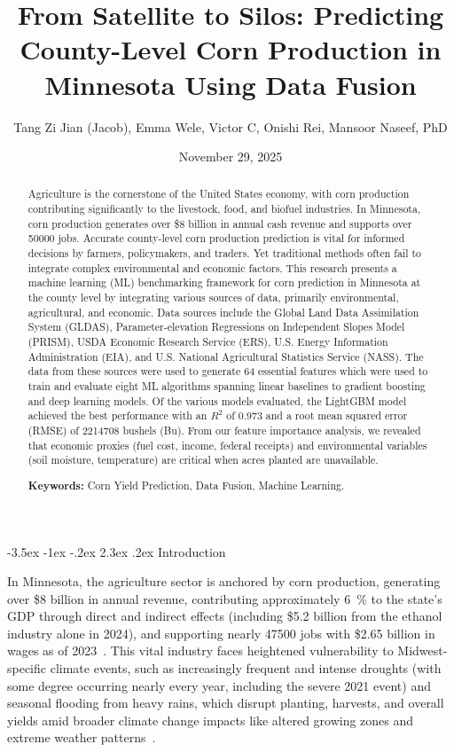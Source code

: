 \documentclass[10pt,twocolumn]{article}
\title{\large\textbf{From Satellite to Silos: Predicting County-Level Corn Production in Minnesota Using Data Fusion}}
\author{\small Tang Zi Jian (Jacob), Emma Wele, Victor C, Onishi Rei, Mansoor Naseef, PhD}
\date{\small November 29, 2025}
\makeatletter
\renewcommand\section{\@startsection{section}{1}{\z@}%
  {-3.5ex \@plus -1ex \@minus -.2ex}%
  {2.3ex \@plus.2ex}%
  {\normalfont\large\bfseries}}
\makeatother
\begin{document}
\maketitle

\begin{abstract}
\small
Agriculture is the cornerstone of the United States economy, with corn production contributing significantly to the livestock, food, and biofuel industries.
In Minnesota, corn production generates over \$8 billion in annual cash revenue and supports over \num{50000} jobs.
Accurate county-level corn production prediction is vital for informed decisions by farmers, policymakers, and traders.
Yet traditional methods often fail to integrate complex environmental and economic factors.
This research presents a machine learning (ML) benchmarking framework for corn prediction in Minnesota at the county level by integrating various sources of data, primarily environmental, agricultural, and economic.
Data sources include the Global Land Data Assimilation System (GLDAS), Parameter-elevation Regressions on Independent Slopes Model (PRISM), USDA Economic Research Service (ERS), U.S. Energy Information Administration (EIA), and U.S. National Agricultural Statistics Service (NASS).
The data from these sources were used to generate 64 essential features which were used to train and evaluate eight ML algorithms spanning linear baselines to gradient boosting and deep learning models.
Of the various models evaluated, the LightGBM model achieved the best performance with an \(R^2\) of \num{0.973} and a root mean squared error (RMSE) of \num{2214708} bushels (Bu).
From our feature importance analysis, we revealed that economic proxies (fuel cost, income, federal receipts) and environmental variables (soil moisture, temperature) are critical when acres planted are unavailable.

\textbf{Keywords:} Corn Yield Prediction, Data Fusion, Machine Learning.
\end{abstract}

\section{Introduction}

In Minnesota, the agriculture sector is anchored by corn production, generating over \$8 billion in annual revenue, contributing approximately \SI{6}{\percent} to the state's GDP through direct and indirect effects (including \$5.2 billion from the ethanol industry alone in 2024), and supporting nearly \num{47500} jobs with \$2.65 billion in wages as of 2023~\cite{usda_ers}.
This vital industry faces heightened vulnerability to Midwest-specific climate events, such as increasingly frequent and intense droughts (with some degree occurring nearly every year, including the severe 2021 event) and seasonal flooding from heavy rains, which disrupt planting, harvests, and overall yields amid broader climate change impacts like altered growing zones and extreme weather patterns~\cite{rodell2004global}.
\end{document}
